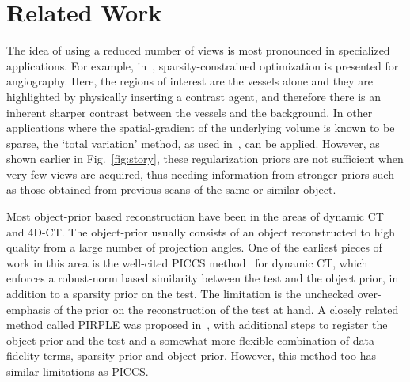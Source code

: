 \documentclass[journal]{IEEEtran}
\begin{document}

 \section{Related Work}
 \label{sec:related}
 The idea of using a reduced number of views is most pronounced in
specialized applications. For example, in~\cite{Essam2015},
sparsity-constrained optimization is presented for angiography. Here,
the regions of interest are the vessels alone and they are highlighted
by physically inserting a contrast agent, and therefore there is an
inherent sharper contrast between the vessels and the background.  In
other applications where the spatial-gradient of the underlying volume
is known to be sparse, the `total variation' method, as used
in~\cite{Li2015,Polak2017}, can be applied.  However, as shown earlier
in Fig.~\ref{fig:story}, these regularization priors are not sufficient when very few
views are acquired, thus needing information from stronger priors such as those obtained from previous scans of the same or similar object. 


Most object-prior based reconstruction have been in the areas of
dynamic CT and 4D-CT. %
The object-prior usually consists of an object
reconstructed to high quality from a large number of projection
angles. One of the earliest pieces of work in this area is the
well-cited PICCS method~\cite{PICCS} for dynamic CT, which enforces a robust-norm
based similarity between the test and the object prior,
in addition to a sparsity prior on the test. The limitation is the
unchecked over-emphasis of the prior on the reconstruction of the test
at hand. A closely related method called PIRPLE was proposed
in~\cite{pirple}, with additional steps to register the object prior
and the test and a somewhat more flexible combination of data fidelity
terms, sparsity prior and object prior. However, this method too has
similar limitations as PICCS.
\end{document}
